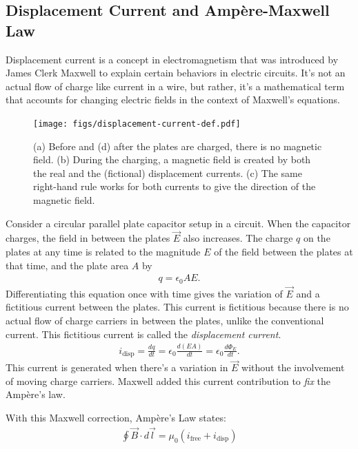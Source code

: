 \documentclass[12pt,b4paper]{article}
\begin{document}
\subsection{Displacement Current and Ampère-Maxwell Law}
Displacement current is a concept in electromagnetism that was introduced by James Clerk Maxwell to explain certain behaviors in electric circuits. It's not an actual flow of charge like current in a wire, but rather, it's a mathematical term that accounts for changing electric fields in the context of Maxwell's equations.
\begin{figure}[H]
    \centering
    \texttt{[image: figs/displacement-current-def.pdf]}
    \caption{(a) Before and (d) after the plates are charged, there is no magnetic field. (b) During the charging, a magnetic field is created by both the real and the (fictional) displacement currents. (c) The same right-hand rule works for both currents to give the direction of the magnetic field.}
    \label{fig:displacement-current}
\end{figure}
Consider a circular parallel plate capacitor setup in a circuit. When the capacitor charges, the field in between the plates $\vec{E}$ also increases. The charge $q$ on the plates at any time is related to the magnitude $E$ of the
field between the plates at that time, and the plate area $A$ by
\begin{align}
    q=\epsilon_0AE.
\end{align}
Differentiating this equation once with time gives the variation of $\vec{E}$ and a fictitious current between the plates. This current is fictitious because there is no actual flow of charge carriers in between the plates, unlike the conventional current. This fictitious current is called the \textit{displacement current}.
\begin{align}
    i_\text{disp}=\frac{dq}{dt}=\epsilon_0\frac{d(EA)}{dt}=\epsilon_0\frac{d\Phi_E}{dt}.
\end{align}
This current is generated when there's a variation in $\vec{E}$ without the involvement of moving charge carriers. Maxwell added this current contribution to \textit{fix} the Ampère's law.

With this Maxwell correction, Ampère's Law states:
\begin{align}
    \oint\vec{B}\cdot d\vec{l}=\mu_0\left(i_\text{free}+i_\text{disp}\right)
\end{align}
\end{document}
